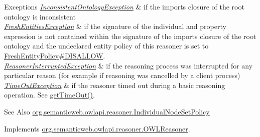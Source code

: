\begin{DoxyExceptions}{Exceptions}
{\em \hyperlink{classorg_1_1semanticweb_1_1owlapi_1_1reasoner_1_1_inconsistent_ontology_exception}{Inconsistent\-Ontology\-Exception}} & if the imports closure of the root ontology is inconsistent \\
\hline
{\em \hyperlink{classorg_1_1semanticweb_1_1owlapi_1_1reasoner_1_1_fresh_entities_exception}{Fresh\-Entities\-Exception}} & if the signature of the individual and property expression is not contained within the signature of the imports closure of the root ontology and the undeclared entity policy of this reasoner is set to \hyperlink{enumorg_1_1semanticweb_1_1owlapi_1_1reasoner_1_1_fresh_entity_policy_a762eae6d5b2449d125311ecaabfdc8d0}{Fresh\-Entity\-Policy\#\-D\-I\-S\-A\-L\-L\-O\-W}. \\
\hline
{\em \hyperlink{classorg_1_1semanticweb_1_1owlapi_1_1reasoner_1_1_reasoner_interrupted_exception}{Reasoner\-Interrupted\-Exception}} & if the reasoning process was interrupted for any particular reason (for example if reasoning was cancelled by a client process) \\
\hline
{\em \hyperlink{classorg_1_1semanticweb_1_1owlapi_1_1reasoner_1_1_time_out_exception}{Time\-Out\-Exception}} & if the reasoner timed out during a basic reasoning operation. See \hyperlink{classorg_1_1semanticweb_1_1owlapi_1_1reasoner_1_1impl_1_1_o_w_l_reasoner_base_af55342eaaabb1b72dacfde7a181b93d2}{get\-Time\-Out()}. \\
\hline
\end{DoxyExceptions}
\begin{DoxySeeAlso}{See Also}
\hyperlink{enumorg_1_1semanticweb_1_1owlapi_1_1reasoner_1_1_individual_node_set_policy}{org.\-semanticweb.\-owlapi.\-reasoner.\-Individual\-Node\-Set\-Policy} 
\end{DoxySeeAlso}


Implements \hyperlink{interfaceorg_1_1semanticweb_1_1owlapi_1_1reasoner_1_1_o_w_l_reasoner_a0e21a5c9c397fc691a120cc2a0ce161c}{org.\-semanticweb.\-owlapi.\-reasoner.\-O\-W\-L\-Reasoner}.


